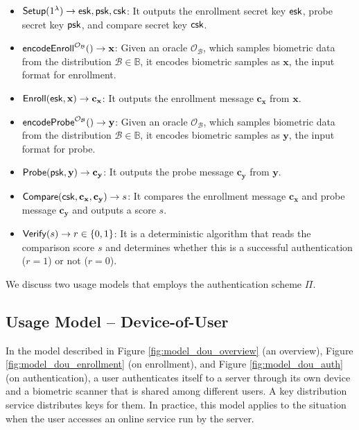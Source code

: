 \begin{itemize}

	\item ${\sf Setup}(1^\lambda) \to {\sf esk}, {\sf psk}, {\sf csk}$: It outputs the enrollment secret key ${\sf esk}$, probe secret key ${\sf psk}$, and compare secret key $\sf csk$.

	\item ${\sf encodeEnroll}^{\mathcal{O}_{\mathcal{B}}}() \to \mathbf{x}$: Given an oracle $\mathcal{O}_{\mathcal{B}}$, which samples biometric data from the distribution $\mathcal{B} \in \mathbb{B}$, it encodes biometric samples as $\mathbf{x}$, the input format for enrollment. 

	\item ${\sf Enroll}({\sf esk}, \mathbf{x}) \to \mathbf{c_x}$: It outputs the enrollment message $\mathbf{c_x}$ from $\mathbf{x}$.

	\item ${\sf encodeProbe}^{\mathcal{O}_{\mathcal{B}}}() \to \mathbf{y}$: Given an oracle $\mathcal{O}_{\mathcal{B}}$, which samples biometric data from the distribution $\mathcal{B} \in \mathbb{B}$, it encodes biometric samples as $\mathbf{y}$, the input format for probe.

	\item ${\sf Probe}({\sf psk}, \mathbf{y}) \to \mathbf{c_y}$: It outputs the probe message $\mathbf{c_y}$ from $\mathbf{y}$.

	\item ${\sf Compare}({\sf csk}, \mathbf{c_x}, \mathbf{c_y)} \to s$: It compares the enrollment message $\mathbf{c_x}$ and probe message $\mathbf{c_y}$ and outputs a score $s$.

	\item ${\sf Verify}(s) \to r \in \{0,1\}$: It is a deterministic algorithm that reads the comparison score $s$ and determines whether this is a successful authentication ($r = 1$) or not ($r = 0$).

\end{itemize}


We discuss two usage models that employs the authentication scheme $\Pi$.


\subsection{Usage Model – Device-of-User}
\label{sec:dou_model}

In the model described in Figure \ref{fig:model_dou_overview} (an overview), Figure \ref{fig:model_dou_enrollment} (on enrollment), and Figure \ref{fig:model_dou_auth} (on authentication), a user authenticates itself to a server through its own device and a biometric scanner that is shared among different users. A key distribution service distributes keys for them. In practice, this model applies to the situation when the user accesses an online service run by the server.

